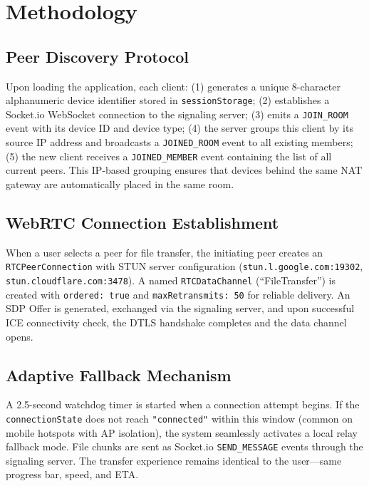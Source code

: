 \documentclass[conference]{IEEEtran}
\begin{document}
\section{Methodology}

\subsection{Peer Discovery Protocol}
Upon loading the application, each client: (1) generates a unique 8-character alphanumeric device identifier stored in \texttt{sessionStorage}; (2) establishes a Socket.io WebSocket connection to the signaling server; (3) emits a \texttt{JOIN\_ROOM} event with its device ID and device type; (4) the server groups this client by its source IP address and broadcasts a \texttt{JOINED\_ROOM} event to all existing members; (5) the new client receives a \texttt{JOINED\_MEMBER} event containing the list of all current peers. This IP-based grouping ensures that devices behind the same NAT gateway are automatically placed in the same room.

\subsection{WebRTC Connection Establishment}
When a user selects a peer for file transfer, the initiating peer creates an \texttt{RTCPeerConnection} with STUN server configuration (\texttt{stun.l.google.com:19302}, \texttt{stun.cloudflare.com:3478}). A named \texttt{RTCDataChannel} (``FileTransfer'') is created with \texttt{ordered: true} and \texttt{maxRetransmits: 50} for reliable delivery. An SDP Offer is generated, exchanged via the signaling server, and upon successful ICE connectivity check, the DTLS handshake completes and the data channel opens.

\subsection{Adaptive Fallback Mechanism}
A 2.5-second watchdog timer is started when a connection attempt begins. If the \texttt{connectionState} does not reach \texttt{"connected"} within this window (common on mobile hotspots with AP isolation), the system seamlessly activates a local relay fallback mode. File chunks are sent as Socket.io \texttt{SEND\_MESSAGE} events through the signaling server. The transfer experience remains identical to the user---same progress bar, speed, and ETA.
\end{document}
